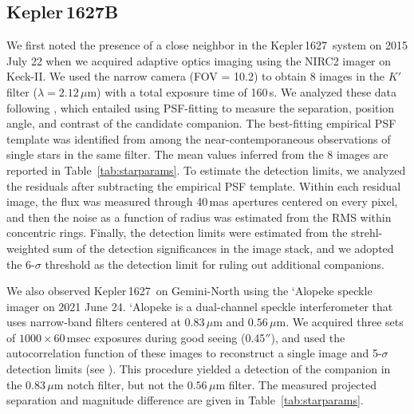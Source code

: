 \documentclass[12pt,modern,twocolumn,tighten]{aastex63}
\newcommand{\sn}{Kepler\,1627} %
\begin{document}
\subsection{Kepler\,1627B}

We first noted the presence of a close neighbor in the \sn\ system on
2015 July 22 when we acquired adaptive optics imaging using the NIRC2
imager on Keck-II.  We used the narrow camera (FOV = 10.2\arcsec) to
obtain 8 images in the $K'$ filter ($\lambda = 2.12\,\mu$m) with a
total exposure time of 160\,s. We analyzed these data following
\citet{kraus_impact_2016}, which entailed using PSF-fitting to measure
the separation, position angle, and contrast of the candidate
companion.  The best-fitting empirical PSF template was identified
from among the near-contemporaneous observations of single stars in
the same filter.  The mean values inferred from the 8 images are
reported in Table~\ref{tab:starparams}.  To estimate the detection
limits, we analyzed the residuals after subtracting the empirical PSF
template. Within each residual image, the flux was measured through
40\,mas apertures centered on every pixel, and then the noise as a
function of radius was estimated from the RMS within concentric rings.
Finally, the detection limits were estimated from the strehl-weighted
sum of the detection significances in the image stack, and we adopted
the $6$-$\sigma$ threshold as the detection limit for ruling out
additional companions.

We also observed \sn\ on Gemini-North using the `Alopeke speckle
imager on 2021 June 24.  `Alopeke is a dual-channel speckle
interferometer that uses narrow-band filters centered at 0.83\,$\mu$m
and $0.56\,\mu$m.  We acquired three sets of $1000\times 60$$\,$msec
exposures during good seeing (0.45$''$), and used the autocorrelation
function of these images to reconstruct a single image and 5-$\sigma$
detection limits (see \citealt{howell_speckle_2011}).  This procedure
yielded a detection of the companion in the 0.83\,$\mu$m notch filter,
but not the $0.56\,\mu$m filter.  The measured projected separation
and magnitude difference are given in Table~\ref{tab:starparams}.
\end{document}
